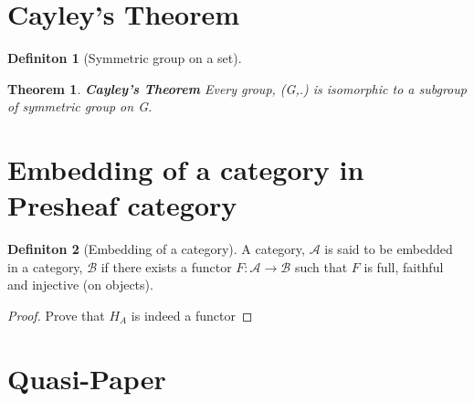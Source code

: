 \documentclass[18pt,a4paper]{article}
\newtheorem{theorem}{Theorem}[section]
\theoremstyle{definition}
\newtheorem{definition}{Definiton}[section]
\begin{document}
\section{Cayley's Theorem}%
\begin{definition}[Symmetric group on a set] %

\end{definition}



\begin{theorem}{\textbf{Cayley's Theorem}} %
Every group, (G,.) is isomorphic to a subgroup of symmetric group on G.
\end{theorem}

\section{Embedding of a category in Presheaf category}%

\begin{definition}[Embedding of a category] %
A category, $\mathcal{A}$  is said to be embedded in a category, $\mathcal{B}$ if there exists a
functor $F: \mathcal{A} \to \mathcal{B} $ such that $F$ is full, faithful and injective (on objects).
\end{definition} %

\begin{proof}
	Prove that $H_A$ is indeed a functor

\end{proof}




\section{Quasi-Paper}%
\label{sec:quasi_paper}
\end{document}
